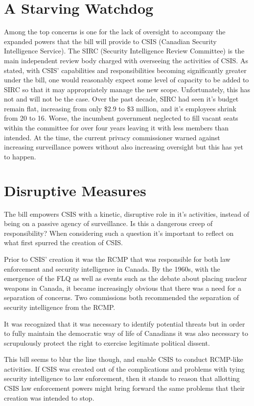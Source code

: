\documentclass[a4paper, 11pt]{article} %
\begin{document}
\section*{A Starving Watchdog}
Among the top concerns is one for the lack of oversight to accompany the expanded powers that  the bill will provide to CSIS (Canadian Security Intelligence Service). The SIRC (Security Intelligence Review Committee) is the main independent review body charged with overseeing the activities of CSIS. As stated, with CSIS' capabilities and responsibilities becoming significantly greater under the bill, one would reasonably expect some level of capacity to be added to SIRC so that it may appropriately manage the new scope. Unfortunately, this has not and will not be the case. Over the past decade, SIRC had seen it's budget remain flat, increasing from only \$2.9 to \$3 million, and it's employees shrink from 20 to 16. Worse, the incumbent government neglected to fill vacant seats within the committee for over four years leaving it with less members than intended. At the time, the current privacy commissioner warned against increasing surveillance powers without also increasing oversight but this has yet to happen. \cite{watchdog-starved}

\section*{Disruptive Measures}
The bill empowers CSIS with a kinetic, disruptive role in it's activities, instead of being on a passive agency of surveillance. Is this a dangerous creep of responsibility? When considering such a question it's important to reflect on what first spurred the creation of CSIS.

Prior to CSIS' creation it was the RCMP that was responsible for both law enforcement and security intelligence in Canada. By the 1960s, with the emergence of the FLQ as well as events such as the debate about placing nuclear weapons in Canada, it became increasingly obvious that there was a need for a separation of concerns. Two commissions both recommended the separation of security intelligence from the RCMP.

It was recognized that it was necessary to identify potential threats but in order to fully maintain the democratic way of life of Canadians it was also necessary to scrupulously protect the right to exercise legitimate political dissent. \cite{history-of-csis}

This bill seems to blur the line though, and enable CSIS to conduct RCMP-like activities. If CSIS was created out of the complications and problems with tying security intelligence to law enforcement, then it stands to reason that allotting CSIS law enforcement powers might bring forward the same problems that their creation was intended to stop.
\end{document}
